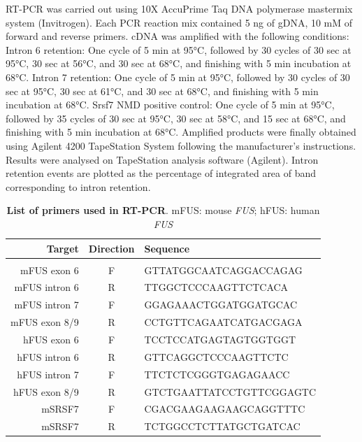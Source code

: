 RT-PCR was carried out using 10X AccuPrime Taq DNA polymerase mastermix system (Invitrogen). 
Each PCR reaction mix contained 5 ng of gDNA, 10 mM of forward and reverse primers. cDNA was amplified with the following conditions:
Intron 6 retention: One cycle of 5 min at 95\si{\degree}C, followed by 30 cycles of 30 sec at 95\si{\degree}C, 30 sec at 56\si{\degree}C, and 30 sec at 68\si{\degree}C, and finishing with 5 min incubation at 68\si{\degree}C.
Intron 7 retention: One cycle of 5 min at 95\si{\degree}C, followed by 30 cycles of 30 sec at 95\si{\degree}C, 30 sec at 61\si{\degree}C, and 30 sec at 68\si{\degree}C, and finishing with 5 min incubation at 68\si{\degree}C.
Srsf7 NMD positive control: One cycle of 5 min at 95\si{\degree}C, followed by 35 cycles of 30 sec at 95\si{\degree}C, 30 sec at 58\si{\degree}C, and 15 sec at 68\si{\degree}C, and finishing with 5 min incubation at 68\si{\degree}C.
Amplified products were finally obtained using Agilent 4200 TapeStation System following the manufacturer's instructions. Results were analysed on TapeStation analysis software (Agilent).
Intron retention events are plotted  as the percentage of integrated area of band corresponding to intron retention.



\begin{table}[h!]
	\centering
	\begin{tabular}{rcl}
		\textbf{Target} & \textbf{Direction} & \textbf{Sequence}\\
		\hline \\[-0.3cm]
		mFUS exon 6  & F &  GTTATGGCAATCAGGACCAGAG\\
		mFUS intron 6 & R & TTGGCTCCCAAGTTCTCACA\\
		mFUS intron 7 & F &  GGAGAAACTGGATGGATGCAC\\
		mFUS exon 8/9 & R &  CCTGTTCAGAATCATGACGAGA\\[0.2cm]
		hFUS exon 6 & F & TCCTCCATGAGTAGTGGTGGT \\
		hFUS intron 6 & R & GTTCAGGCTCCCAAGTTCTC\\
		hFUS intron 7 & F & TTCTCTCGGGTGAGAGAACC\\
		hFUS exon 8/9 & R & GTCTGAATTATCCTGTTCGGAGTC\\[0.2cm]
		mSRSF7 & F &  CGACGAAGAAGAAGCAGGTTTC\\
		mSRSF7& R & TCTGGCCTCTTATGCTGATCAC\\
	\end{tabular}
	\caption[List of primers used in RT-PCR]{
		\textbf{List of primers used in RT-PCR}. 
		mFUS: mouse \textit{FUS}; hFUS: human \textit{FUS}
	}
	\label{tab:fus_primers}
\end{table}

